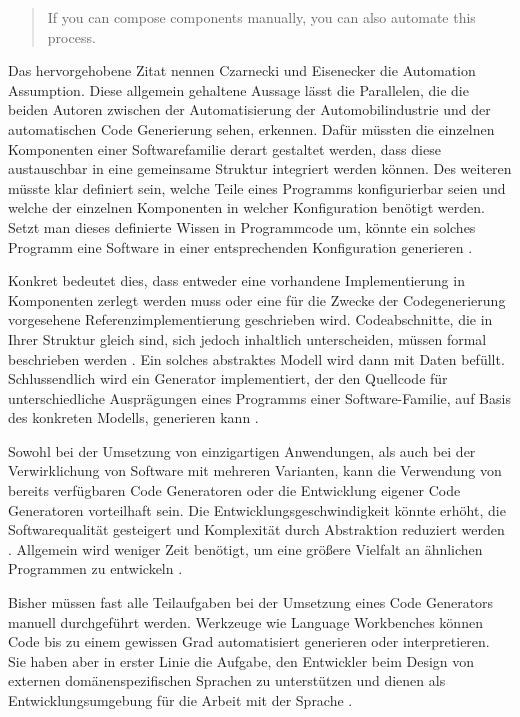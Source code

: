 \documentclass[12pt,oneside,a4paper,parskip]{scrbook}
\begin{document}
\begin{quote}
	\glqq If you can compose components manually, you can also automate this process.\grqq
\end{quote}

Das hervorgehobene Zitat nennen Czarnecki und Eisenecker die Automation Assumption. Diese allgemein gehaltene Aussage lässt die Parallelen, die die beiden Autoren zwischen der Automatisierung der Automobilindustrie und der automatischen Code Generierung sehen, erkennen. Dafür müssten die einzelnen Komponenten einer Softwarefamilie derart gestaltet werden, dass diese austauschbar in eine gemeinsame Struktur integriert werden können. Des weiteren müsste klar definiert sein, welche Teile eines Programms konfigurierbar seien und welche der einzelnen Komponenten in welcher Konfiguration benötigt werden. Setzt man dieses definierte Wissen in Programmcode um, könnte ein solches Programm eine Software in einer entsprechenden Konfiguration generieren \cite{czaeis2000}.

Konkret bedeutet dies, dass entweder eine vorhandene Implementierung in Komponenten zerlegt werden muss oder eine für die Zwecke der Codegenerierung vorgesehene Referenzimplementierung geschrieben wird. Codeabschnitte, die in Ihrer Struktur gleich sind, sich jedoch inhaltlich unterscheiden, müssen formal beschrieben werden \cite{stahl2007}. Ein solches abstraktes Modell wird dann mit Daten befüllt. Schlussendlich wird ein Generator implementiert, der den Quellcode für unterschiedliche Ausprägungen eines Programms einer Software-Familie, auf Basis des konkreten Modells, generieren kann \cite{fowler2010}.

Sowohl bei der Umsetzung von einzigartigen Anwendungen, als auch bei der Verwirklichung von Software mit mehreren Varianten, kann die Verwendung von bereits verfügbaren Code Generatoren oder die Entwicklung eigener Code Generatoren vorteilhaft sein. Die Entwicklungsgeschwindigkeit könnte erhöht, die Softwarequalität gesteigert und Komplexität durch Abstraktion reduziert werden \cite{stahl2007}. Allgemein wird weniger Zeit benötigt, um eine größere Vielfalt an ähnlichen Programmen zu entwickeln \cite{czaeis2000}.

Bisher müssen fast alle Teilaufgaben bei der Umsetzung eines Code Generators manuell durchgeführt werden. Werkzeuge wie Language Workbenches können Code bis zu einem gewissen Grad automatisiert generieren oder interpretieren. Sie haben aber in erster Linie die Aufgabe, den Entwickler beim Design von externen domänenspezifischen Sprachen zu unterstützen und dienen als Entwicklungsumgebung für die Arbeit mit der Sprache \cite{fowler2010}.
\end{document}
